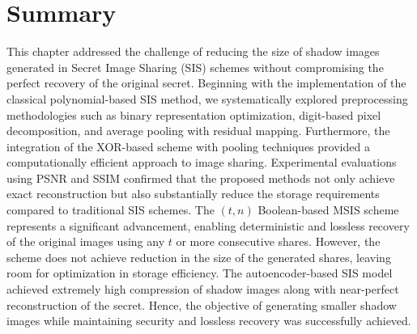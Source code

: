 \section{Summary}
 
This chapter addressed the challenge of reducing the size of shadow images generated in Secret Image Sharing (SIS) schemes without compromising the perfect recovery of the original secret. Beginning with the implementation of the classical polynomial-based SIS method, we systematically explored preprocessing methodologies such as binary representation optimization, digit-based pixel decomposition, and average pooling with residual mapping. Furthermore, the integration of the XOR-based scheme with pooling techniques provided a computationally efficient approach to image sharing. Experimental evaluations using PSNR and SSIM confirmed that the proposed methods not only achieve exact reconstruction but also substantially reduce the storage requirements compared to traditional SIS schemes. The $(t, n)$ Boolean-based MSIS scheme represents a significant advancement, enabling deterministic and lossless recovery of the original images using any $t$ or more consecutive shares. However, the scheme does not achieve reduction in the size of the generated shares, leaving room for optimization in storage efficiency. The autoencoder-based SIS model achieved extremely high compression of shadow images along with near-perfect reconstruction of the secret. Hence, the objective of generating smaller shadow images while maintaining security and lossless recovery was successfully achieved.